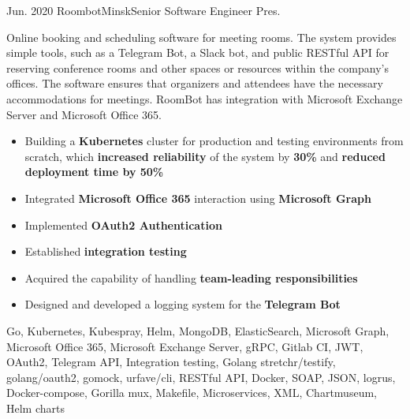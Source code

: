 \begin{experiences}
  \experience
  {Jun. 2020} {Roombot}{Minsk}{Senior Software Engineer}
  {Pres.}
  {
    Online booking and scheduling software for meeting rooms. The system provides simple tools, such as a Telegram Bot,
    a Slack bot, and public RESTful API for reserving conference rooms and other spaces or resources within the company's
  offices. The software ensures that organizers and attendees have the necessary accommodations for meetings.
  RoomBot has integration with Microsoft Exchange Server and Microsoft Office 365.
    \begin{itemize}
      \item {Building a \textbf{Kubernetes} cluster for production and testing environments from scratch, which \textbf{increased reliability} of the system by \textbf{30\%}
      and \textbf{reduced deployment time by 50\%}}
      \item {Integrated \textbf{Microsoft Office 365} interaction using \textbf{Microsoft Graph}}
      \item {Implemented \textbf{OAuth2 Authentication}}
      \item {Established \textbf{integration testing}}
      \item {Acquired the capability of handling \textbf{team-leading responsibilities}}
      \item {Designed and developed a logging system for the \textbf{Telegram Bot}}
    \end{itemize}
  }
  {
    Go, Kubernetes, Kubespray, Helm, MongoDB, ElasticSearch, Microsoft Graph, Microsoft Office 365, Microsoft Exchange Server,
    gRPC, Gitlab CI, JWT, OAuth2, Telegram API, Integration testing, Golang stretchr/testify, golang/oauth2, gomock, urfave/cli, RESTful API, Docker, SOAP, JSON, logrus, Docker-compose, Gorilla mux, Makefile, Microservices, XML,
    Chartmuseum, Helm charts
  }
  \emptySeparator


\end{experiences}
